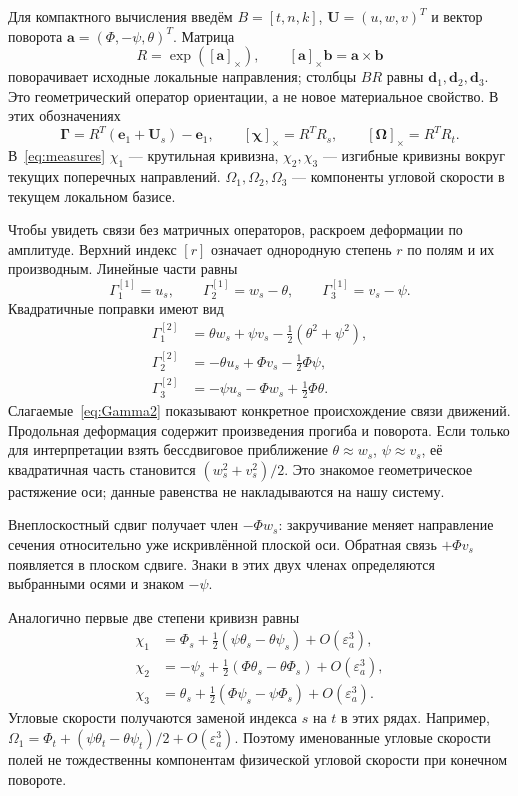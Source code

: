\documentclass[11pt,a4paper]{article}
\newcommand{\Gam}{\boldsymbol\Gamma}
\newcommand{\Om}{\boldsymbol\Omega}
\newcommand{\Chi}{\boldsymbol\chi}
\newcommand{\eone}{\mathbf e_1}
\begin{document}
Для компактного вычисления введём $B=[t,n,k]$, $\mathbf U=(u,w,v)^T$ и вектор поворота $\mathbf a=(\Phi,-\psi,\theta)^T$. Матрица
\[
R=\exp([\mathbf a]_\times),\qquad [\mathbf a]_\times\mathbf b=\mathbf a\times\mathbf b
\]
поворачивает исходные локальные направления; столбцы $BR$ равны $\mathbf d_1,\mathbf d_2,\mathbf d_3$. Это геометрический оператор ориентации, а не новое материальное свойство. В этих обозначениях
\begin{equation}
\Gam=R^T(\eone+\mathbf U_s)-\eone,
\qquad [\Chi]_\times=R^TR_s,
\qquad [\Om]_\times=R^TR_t.
\label{eq:measures}
\end{equation}
В~\eqref{eq:measures} $\chi_1$ --- крутильная кривизна, $\chi_2,\chi_3$ --- изгибные кривизны вокруг текущих поперечных направлений. $\Omega_1,\Omega_2,\Omega_3$ --- компоненты угловой скорости в текущем локальном базисе.

Чтобы увидеть связи без матричных операторов, раскроем деформации по амплитуде. Верхний индекс $[r]$ означает однородную степень $r$ по полям и их производным. Линейные части равны
\[
\Gamma_1^{[1]}=u_s,\qquad
\Gamma_2^{[1]}=w_s-\theta,\qquad
\Gamma_3^{[1]}=v_s-\psi.
\]
Квадратичные поправки имеют вид
\begin{equation}
\begin{aligned}
\Gamma_1^{[2]}&=\theta w_s+\psi v_s-\tfrac12(\theta^2+\psi^2),\\
\Gamma_2^{[2]}&=-\theta u_s+\Phi v_s-\tfrac12\Phi\psi,\\
\Gamma_3^{[2]}&=-\psi u_s-\Phi w_s+\tfrac12\Phi\theta.
\end{aligned}
\label{eq:Gamma2}
\end{equation}
Слагаемые~\eqref{eq:Gamma2} показывают конкретное происхождение связи движений. Продольная деформация содержит произведения прогиба и поворота. Если только для интерпретации взять бессдвиговое приближение $\theta\approx w_s$, $\psi\approx v_s$, её квадратичная часть становится $(w_s^2+v_s^2)/2$. Это знакомое геометрическое растяжение оси; данные равенства не накладываются на нашу систему.

Внеплоскостный сдвиг получает член $-\Phi w_s$: закручивание меняет направление сечения относительно уже искривлённой плоской оси. Обратная связь $+\Phi v_s$ появляется в плоском сдвиге. Знаки в этих двух членах определяются выбранными осями и знаком $-\psi$.

Аналогично первые две степени кривизн равны
\[
\begin{aligned}
\chi_1&=\Phi_s+\tfrac12(\psi\theta_s-\theta\psi_s)+O(\varepsilon_a^3),\\
\chi_2&=-\psi_s+\tfrac12(\Phi\theta_s-\theta\Phi_s)+O(\varepsilon_a^3),\\
\chi_3&=\theta_s+\tfrac12(\Phi\psi_s-\psi\Phi_s)+O(\varepsilon_a^3).
\end{aligned}
\]
Угловые скорости получаются заменой индекса $s$ на $t$ в этих рядах. Например, $\Omega_1=\Phi_t+(\psi\theta_t-\theta\psi_t)/2+O(\varepsilon_a^3)$. Поэтому именованные угловые скорости полей не тождественны компонентам физической угловой скорости при конечном повороте.
\end{document}
